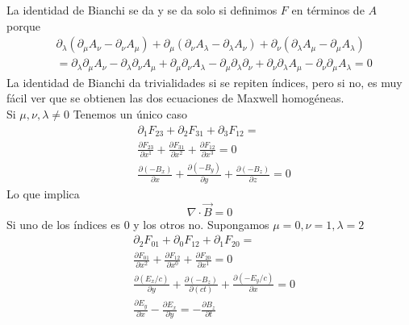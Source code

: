 \documentclass[12pt]{article}
\begin{document}
La identidad de Bianchi se da y se da solo si definimos $F$ en términos de $A$ porque 
\begin{equation*}
    \begin{split}
      &  \partial_\lambda (\partial_\mu A_\nu -\partial_\nu A_\mu)+\partial_\mu (\partial_\nu A_\lambda -\partial_\lambda A_\nu)+\partial_\nu (\partial_\lambda A_\mu -\partial_\mu A_\lambda)  \\ 
    & = \partial_\lambda\partial_\mu A_\nu -\partial_\lambda\partial_\nu A_\mu +\partial_\mu\partial_\nu A_\lambda-\partial_\mu \partial_\lambda\partial_\nu +\partial_\nu\partial_\lambda A_\mu -\partial_\nu\partial_\mu A_\lambda= 0
    \end{split}
\end{equation*}
La identidad de Bianchi da trivialidades si se repiten índices, pero si no, es muy fácil ver que se obtienen las dos ecuaciones de Maxwell homogéneas. \\
Si  $\mu,\nu,\lambda \neq 0$ Tenemos un único caso
\begin{equation*}
\begin{split}
        & \partial_1 F_{23}+\partial_2 F_{31}+\partial_3 F_{12}= \\ 
    & \frac{\partial F_{23}}{\partial x^1} + \frac{\partial F_{31}}{\partial x^2}+\frac{\partial F_{12}}{\partial x^3}=0 \\
    & \frac{\partial (-B_x)}{\partial x} +\frac{\partial (-B_y)}{\partial y} +\frac{\partial (-B_z)}{\partial z}= 0 
\end{split}
\end{equation*}
Lo que implica 
\begin{equation}
    \nabla \cdot \vec B =0
\end{equation}
Si uno de los índices es 0 y los otros no. Supongamos $\mu=0, \nu =1, \lambda=2$ 
\begin{equation*}
\begin{split}
        & \partial_2 F_{01}+\partial_0 F_{12}+\partial_1 F_{20}= \\ 
    & \frac{\partial F_{01}}{\partial x^2} + \frac{\partial F_{12}}{\partial x^0}+\frac{\partial F_{20}}{\partial x^1}=0 \\
    & \frac{\partial (E_x/c)}{\partial y} +\frac{\partial (-B_z)}{\partial (ct)} +\frac{\partial (-E_y/c)}{\partial x}= 0  \\
    & \frac{\partial E_y}{\partial x}-\frac{\partial E_x}{\partial y}=-\frac{\partial B_z}{\partial t}
\end{split}
\end{equation*}
\end{document}
